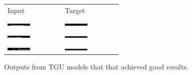 \begin{figure}
\centering
	\begin{tabu} to \textwidth {XX}
		Input & Target \\
		\includegraphics[width=0.45\textwidth, interpolate=false]{exps/vbind/100x1tguinput} & 
		\includegraphics[width=0.45\textwidth, interpolate=false]{exps/vbind/100x1tguoutput} \\
		\includegraphics[width=0.45\textwidth, interpolate=false]{exps/vbind/100x2tguinput} & 
		\includegraphics[width=0.45\textwidth, interpolate=false]{exps/vbind/100x2tguoutput} \\
		\includegraphics[width=0.45\textwidth, interpolate=false]{exps/vbind/100x3tguinput} & 
		\includegraphics[width=0.45\textwidth, interpolate=false]{exps/vbind/100x3tguoutput} \\
	\end{tabu}
	\caption[Example successful outputs for variable binding]{Outputs from TGU models that that
	achieved good results.}
	\label{fid:vbindcorrect}
\end{figure}

